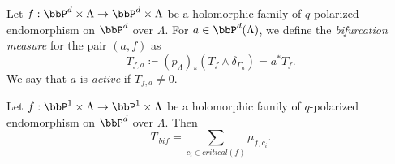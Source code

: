 \Yang{}

\begin{definition}[label=\labelNFM{def:bifurcation-currents-for-a-pair-af}, status=draft, tag=0000000]
	Let $f: \bbP^d \times \Lambda \to \bbP^d \times \Lambda$ be a holomorphic family of $q$-polarized endomorphism on $\bbP^d$ over $\Lambda$.
	For $a \in \bbP^d(\Lambda)$, we define the \emph{bifurcation measure} for the pair $(a,f)$ as
	\[ T_{f,a} \coloneqq (p_\Lambda)_*(T_f \wedge \delta_{\Gamma_a}) = a^*T_f. \]
	We say that $a$ is \emph{active} if $T_{f,a} \neq 0$.
	\Yang{}
\end{definition}


\begin{proposition}[label=\labelNFM{prop:bifurcation-currents-are-sum-of-critical-points}, status=draft, tag=0000000]
	Let $f: \bbP^1 \times \Lambda \to \bbP^1 \times \Lambda$ be a holomorphic family of $q$-polarized endomorphism on $\bbP^d$ over $\Lambda$.
	Then
	\[ T_{\ bif} = \sum_{c_i \in critical(f)} \mu_{f,c_i}. \]
	\Yang{}
\end{proposition}

